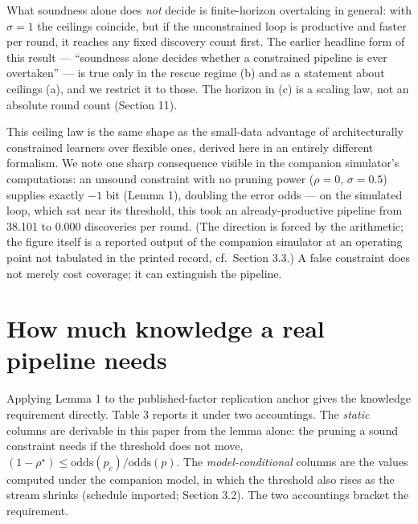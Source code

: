 \documentclass[11pt]{article}
\begin{document}
What soundness alone does \emph{not} decide is finite-horizon overtaking in
general: with $\sigma = 1$ the ceilings coincide, but if the unconstrained
loop is productive and faster per round, it reaches any fixed discovery
count first. The earlier headline form of this result --- ``soundness alone
decides whether a constrained pipeline is ever overtaken'' --- is true only
in the rescue regime (b) and as a statement about ceilings (a), and we
restrict it to those. The horizon in (c) is a scaling law, not an absolute
round count (Section 11).

This ceiling law is the same shape as the small-data advantage of
architecturally constrained learners over flexible ones, derived here in an
entirely different formalism. We note one sharp consequence visible in the
companion simulator's computations: an unsound constraint with no pruning
power ($\rho = 0$, $\sigma = 0.5$) supplies exactly $-1$ bit (Lemma 1),
doubling the error odds --- on the simulated loop, which sat near its
threshold, this took an already-productive pipeline from 38.101 to 0.000
discoveries per round. (The direction is forced by the arithmetic; the
figure itself is a reported output of the companion simulator at an
operating point not tabulated in the printed record, cf.\ Section 3.3.) A
false constraint does not merely cost coverage; it can extinguish the
pipeline.

\section{How much knowledge a real pipeline needs}

Applying Lemma 1 to the published-factor replication anchor \cite{hou} gives
the knowledge requirement directly. Table 3 reports it under two
accountings. The \emph{static} columns are derivable in this paper from the
lemma alone: the pruning a sound constraint needs if the threshold does not
move, $(1-\rho^\star) \leq \mathrm{odds}(p_c)/\mathrm{odds}(p)$. The
\emph{model-conditional} columns are the values computed under the companion
model, in which the threshold also rises as the stream shrinks (schedule
imported; Section 3.2). The two accountings bracket the requirement.
\end{document}
